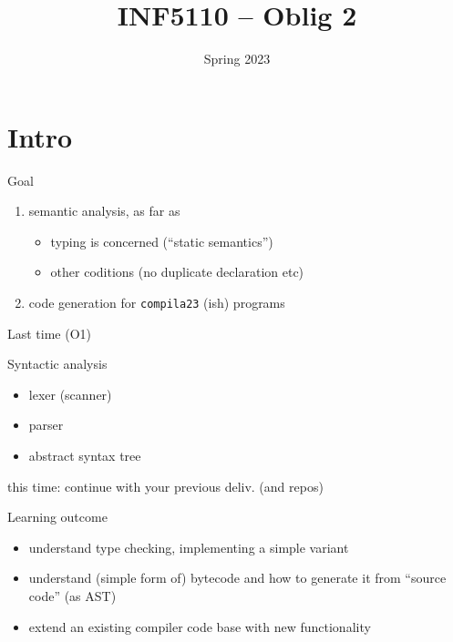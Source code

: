 \documentclass{beamer}
\date{Spring 2023}
\title{INF5110 -- Oblig  2}
\renewcommand{\maketitle}{}
\begin{document}
\maketitle
\section{Intro}
\label{sec:orgcf46438}
\begin{frame}[label={sec:orgf0c4dc9},fragile]{Goal}
 \begin{enumerate}
\item \alert{semantic  analysis}, as far as 
\begin{itemize}
\item \alert{typing} is concerned (``static semantics'')
\item other coditions (no duplicate declaration etc)
\end{itemize}

\item \alert{code generation} for \texttt{compila23} (ish) programs
\end{enumerate}
\end{frame}






\begin{frame}[label={sec:org32ceaa1}]{Last time (O1)}
\begin{block}{Syntactic analysis}
\begin{itemize}
\item lexer (scanner)
\item parser
\item abstract syntax tree
\end{itemize}
\end{block}



\alert{this time}: continue with your previous deliv. (and repos)
\end{frame}



\begin{frame}[label={sec:org69a938f}]{Learning outcome}
\begin{itemize}
\item understand type checking, implementing a simple variant
\end{itemize}


\begin{itemize}
\item understand (simple form of) bytecode and how to generate it from ``source
code'' (as AST)

\item extend an existing compiler code base with new functionality
\end{itemize}
\end{frame}
\end{document}
